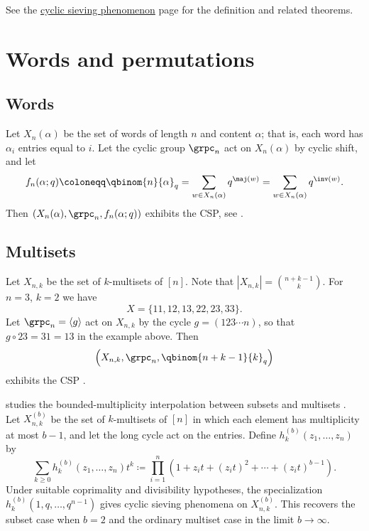 
See the \hyperref[cyclicSieving]{cyclic sieving phenomenon}
page for the definition and related theorems.


\section[cspWord]{Words and permutations}


\subsection[cspWords]{Words}

Let $X_n(\alpha)$ be the set of words of length $n$ and content $\alpha$;
that is, each word has $\alpha_i$ entries equal to $i$.
Let the cyclic group $\grpc_n$ act on $X_n(\alpha)$ by cyclic shift, and let
\[
f_n(\alpha;q)
\coloneqq
\qbinom{n}{\alpha}_q
=
\sum_{w \in X_n(\alpha)} q^{\maj(w)}
=
\sum_{w \in X_n(\alpha)} q^{\inv(w)}.
\]
Then $(X_n(\alpha),\grpc_n,f_n(\alpha;q))$ exhibits the CSP,
see \cite{ReinerStantonWhite2004}.


\subsection[cspMultisets]{Multisets}

Let $X_{n,k}$ be the set of $k$-multisets of $[n]$.
Note that $|X_{n,k}| = \binom{n+k-1}{k}$.
For $n=3$, $k=2$ we have
\[
X = \{11,12,13,22,23,33 \}.
\]
Let $\grpc_n = \langle g \rangle$ act on $X_{n,k}$ by the cycle
$g=(123\dotsb n)$, so that $g\circ 23 = 31 = 13$ in the example above.
Then
\[
\left( X_{n,k}, \grpc_n,  \qbinom{n+k-1}{k}_q \right)
\]
exhibits the CSP \cite{ReinerStantonWhite2004}.

 studies the bounded-multiplicity interpolation between
subsets and multisets \cite{Armstrong2025BoundedMultiplicityCSP}.  Let
$X_{n,k}^{(b)}$ be the set of $k$-multisets of $[n]$ in which each element has
multiplicity at most $b-1$, and let the long cycle act on the entries.  Define
$h_k^{(b)}(z_1,\dotsc,z_n)$ by
\[
  \sum_{k\geq 0} h_k^{(b)}(z_1,\dotsc,z_n)t^k
  \coloneqq \prod_{i=1}^{n}
  \left(1+z_i t+(z_i t)^2+\dotsb+(z_i t)^{b-1}\right).
\]
Under suitable coprimality and divisibility hypotheses, the specialization
$h_k^{(b)}(1,q,\dotsc,q^{n-1})$ gives cyclic sieving phenomena on
$X_{n,k}^{(b)}$.  This recovers the subset case when $b=2$ and the ordinary
multiset case in the limit $b\to \infty$.


